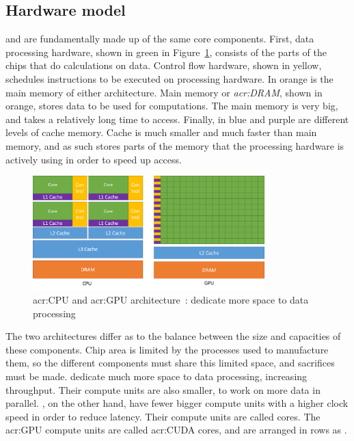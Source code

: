 \subsection{Hardware model}\label{subsection:graphics_processing_units:architecture:hardware_model}

 and  are fundamentally made up of the same core components.
First, data processing hardware, shown in green in Figure~\ref{fig:cpu_gpu}, consists of the parts
of the chips that do calculations on data. Control flow hardware, shown in yellow, schedules
instructions to be executed on processing hardware. In orange is the main memory of either
architecture. Main memory or \textit{\acrfull{acr:DRAM}}, shown in orange, stores data to be used
for computations. The main memory is very big, and takes a relatively long time to access. Finally,
in blue and purple are different levels of cache memory. Cache is much smaller and much faster than
main memory, and as such stores parts of the memory that the processing hardware is actively using
in order to speed up access.

\begin{figure}[H]
	\centering
	\includegraphics[width=0.8\textwidth]{Chapter_graphics_processing_units/media/gpu-devotes-more-transistors-to-data-processing}
	\caption{\Acrshort{acr:CPU} and \acrshort{acr:GPU} architecture~\cite{Nvidia2021}:  dedicate more space to data processing}\label{fig:cpu_gpu}
\end{figure}

The two architectures differ as to the balance between the size and capacities of these components.
Chip area is limited by the processes used to manufacture them, so the different components must
share this limited space, and sacrifices must be made.  dedicate much more space
to data processing, increasing throughput. Their compute units are also smaller, to work on more
data in parallel. , on the other hand, have fewer bigger compute units with a
higher clock speed in order to reduce latency. Their compute units are called cores. The
\acrshort{acr:GPU} compute units are called \acrshort{acr:CUDA} cores, and are arranged in rows as
\textit{}.

